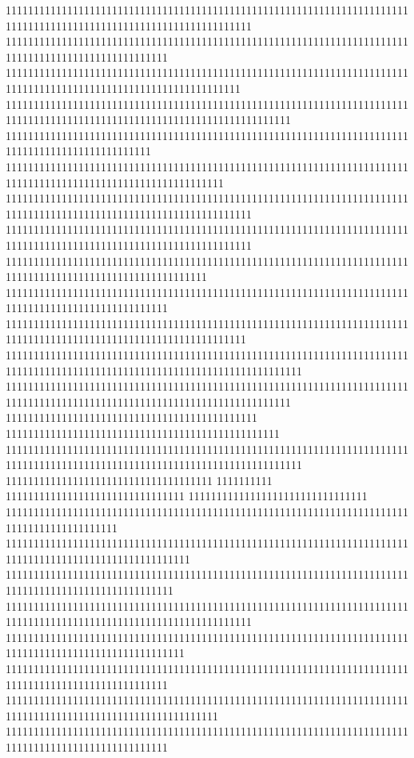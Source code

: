11111111111111111111111111111111111111111111111111111111111111111111111111111111111111111111111111111111111111111111
11111111111111111111111111111111111111111111111111111111111111111111111111111111111111111111111111111
111111111111111111111111111111111111111111111111111111111111111111111111111111111111111111111111111111111111111111
111111111111111111111111111111111111111111111111111111111111111111111111111111111111111111111111111111111111111111111111111
11111111111111111111111111111111111111111111111111111111111111111111111111111111111111111111111111
111111111111111111111111111111111111111111111111111111111111111111111111111111111111111111111111111111111111111
11111111111111111111111111111111111111111111111111111111111111111111111111111111111111111111111111111111111111111111
11111111111111111111111111111111111111111111111111111111111111111111111111111111111111111111111111111111111111111111
111111111111111111111111111111111111111111111111111111111111111111111111111111111111111111111111111111111111
11111111111111111111111111111111111111111111111111111111111111111111111111111111111111111111111111111
1111111111111111111111111111111111111111111111111111111111111111111111111111111111111111111111111111111111111111111
11111111111111111111111111111111111111111111111111111111111111111111111111111111111111111111111111111111111111111111111111111
111111111111111111111111111111111111111111111111111111111111111111111111111111111111111111111111111111111111111111111111111
111111111111111111111111111111111111111111111
1111111111111111111111111111111111111111111111111
11111111111111111111111111111111111111111111111111111111111111111111111111111111111111111111111111111111111111111111111111111
1111111111111111111111111111111111111
1111111111
11111111111111111111111111111111
11111111111111111111111111111111
11111111111111111111111111111111111111111111111111111111111111111111111111111111111111111111
111111111111111111111111111111111111111111111111111111111111111111111111111111111111111111111111111111111
111111111111111111111111111111111111111111111111111111111111111111111111111111111111111111111111111111
11111111111111111111111111111111111111111111111111111111111111111111111111111111111111111111111111111111111111111111
11111111111111111111111111111111111111111111111111111111111111111111111111111111111111111111111111111111
11111111111111111111111111111111111111111111111111111111111111111111111111111111111111111111111111111
11111111111111111111111111111111111111111111111111111111111111111111111111111111111111111111111111111111111111
11111111111111111111111111111111111111111111111111111111111111111111111111111111111111111111111111111
